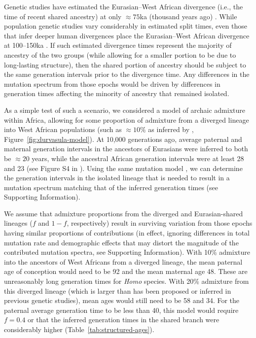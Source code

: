 \documentclass[]{article}
\begin{document}
Genetic studies have estimated the Eurasian--West African divergence (i.e., the
time of recent shared ancestry) at only $\approx 75$ka (thousand years ago)
\citep[e.g.,][]{pagani2015tracing,bergstrom2020insights}. While population
genetic studies vary considerably in estimated split times, even those that
infer deeper human divergences place the Eurasian--West African divergence at
100--150ka \citep[e.g.,][]{schlebusch2017southern}. If such estimated
divergence times represent the majority of ancestry of the two groups (while
allowing for a smaller portion to be due to long-lasting structure), then the
shared portion of ancestry should be subject to the same generation intervals
prior to the divergence time. Any differences in the mutation spectrum from
those epochs would be driven by differences in generation times affecting the
minority of ancestry that remained isolated. 

As a simple test of such a scenario, we considered a model of archaic admixture
within Africa, allowing for some proportion of admixture from a diverged
lineage into West African populations (such as $\approx10\%$ as inferred by
\citet{durvasula2020recovering}, Figure~\ref{fig:durvasula-model}). At 10,000
generations ago, average paternal and maternal generation intervals in the
ancestors of Eurasians were inferred to both be $\approx20$ years, while the
ancestral African generation intervals were at least 28 and 23 (see Figure S4
in \citet{wang2023human}). Using the same mutation model
\citep{jonsson2017parental}, we can determine the generation intervals in the
isolated lineage that is needed to result in a mutation spectrum matching that
of the inferred generation times (see Supporting Information).

We assume that admixture proportions from the diverged and Eurasian-shared
lineages ($f$ and $1-f$, respectively) result in surviving variation from those
epochs having similar proportions of contributions (in effect, ignoring
differences in total mutation rate and demographic effects that may distort
the magnitude of the contributed mutation spectra, see Supporting Information).
With 10\% admixture into the ancestors of West Africans from a diverged
lineage, the mean paternal age of conception would need to be 92 and the mean
maternal age 48.  These are unreasonably long generation times for \emph{Homo}
species. With 20\% admixture from this diverged lineage (which is larger than
has been proposed or inferred in previous genetic studies), mean ages would
still need to be 58 and 34. For the paternal average generation time to be less
than 40, this model would require $f=0.4$ or that the inferred generation times
in the shared branch were considerably higher
(Table~\ref{tab:structured-ages}).
\end{document}
